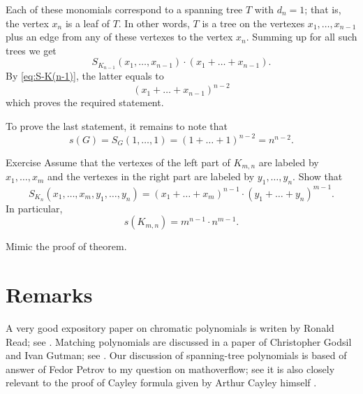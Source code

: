 Each of these monomials correspond to a spanning tree $T$ with $d_n=1$;
that is, the vertex $x_n$ is a leaf of $T$.
In other words, $T$ is a tree on the vertexes $x_1,\dots,x_{n-1}$ plus an edge from any of these vertexes to the vertex $x_n$. 
Summing up for all such trees we get 
\[S_{K_{n-1}}(x_1,\dots,x_{n-1})\cdot(x_1+\dots+x_{n-1}).\]
By \ref{eq:S-K(n-1)}, the latter equals to
\[(x_1+\dots+x_{n-1})^{n-2}\]
which proves the required statement.

To prove the last statement, it remains to note that 
\[s(G)=S_G(1,\dots,1)=(1+\dots+1)^{n-2}=n^{n-2}.\]
\qedsf

\begin{thm}{Exercise}
Assume that the vertexes of the left part of $K_{m,n}$ are labeled by $x_1,\dots,x_m$ and the vertexes in the right part are labeled by $y_1,\dots,y_n$. 
Show that
\[S_{K_n}(x_1,\dots,x_m,y_1,\dots,y_n)=(x_1+\dots +x_m)^{n-1}\cdot(y_1+\dots +y_n)^{m-1}.\]
In particular, 
\[s(K_{m,n})=m^{n-1}\cdot n^{m-1}.\]

\end{thm}

 Mimic the proof of theorem.

\section*{Remarks}

A very good expository paper on chromatic polynomials is writen by
Ronald Read; see \cite{read}. 
Matching polynomials are discussed in a paper of Christopher Godsil and Ivan Gutman; see \cite{godsil-gutman}.
Our discussion of spanning-tree polynomials is based of answer of Fedor Petrov \cite{petrov} to my question on mathoverflow; see  it is also closely relevant to the proof of Cayley formula given by Arthur Cayley himself \cite{cayley}. 